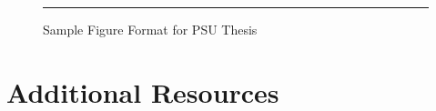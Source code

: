 \documentclass{psu-thesis}
\begin{document}
\lipsum[31]

\begin{figure}[htbp]
\centering
\rule{8cm}{6cm} %
\caption{Sample Figure Format for PSU Thesis}
\end{figure}

\chapter{Additional Resources}

\lipsum[32-35]
\end{document}
